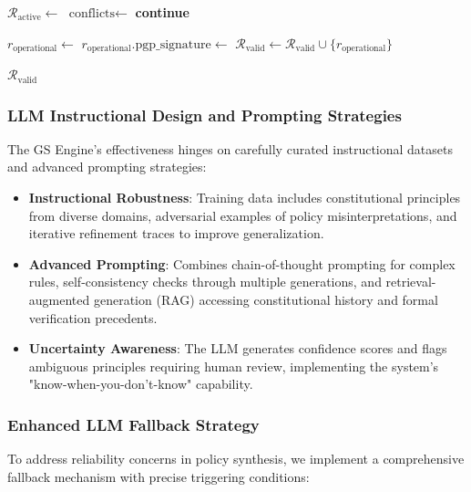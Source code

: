 \documentclass[sigconf,natbib]{acmart}
\begin{document}
\begin{algorithm}[!htbp]
\begin{algorithmic}[1]
    \State $\mathcal{R}_{\text{active}} \gets$ 
    \State $\text{conflicts} \gets$ 
      \State {}
      \State \textbf{continue}
    \EndIf

    \State $r_{\text{operational}} \gets$ 
    \State $r_{\text{operational}}.\text{pgp\_signature} \gets$ 
    \State $\mathcal{R}_{\text{valid}} \gets \mathcal{R}_{\text{valid}} \cup \{r_{\text{operational}}\}$
  \EndFor

  \State \Return $\mathcal{R}_{\text{valid}}$
\EndFunction
\end{algorithmic}
\end{algorithm}

\subsubsection{LLM Instructional Design and Prompting Strategies}
The GS Engine's effectiveness hinges on carefully curated instructional datasets and advanced prompting strategies:
\begin{itemize}
    \item \textbf{Instructional Robustness}: Training data includes constitutional principles from diverse domains, adversarial examples of policy misinterpretations, and iterative refinement traces to improve generalization.
    \item \textbf{Advanced Prompting}: Combines chain-of-thought prompting for complex rules, self-consistency checks through multiple generations, and retrieval-augmented generation (RAG) accessing constitutional history and formal verification precedents.
    \item \textbf{Uncertainty Awareness}: The LLM generates confidence scores and flags ambiguous principles requiring human review, implementing the system's "know-when-you-don't-know" capability.
\end{itemize}

\subsubsection{Enhanced LLM Fallback Strategy}
\label{subsubsec:llm_fallback_strategy}
To address reliability concerns in policy synthesis, we implement a comprehensive fallback mechanism with precise triggering conditions:
\end{document}
